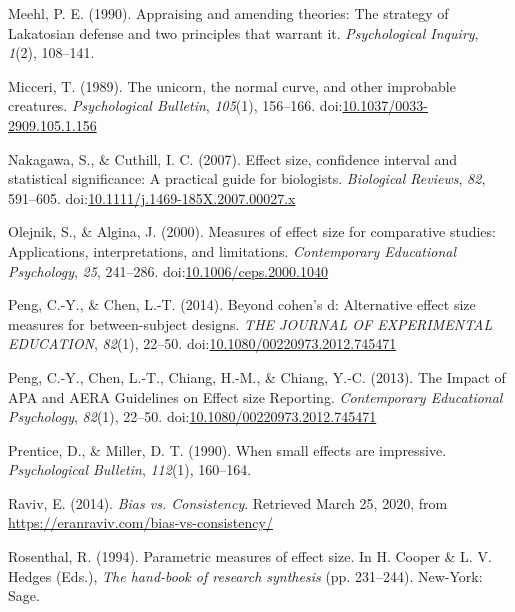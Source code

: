 \documentclass[
  man,floatsintext]{apa6}
\begin{document}
\leavevmode\hypertarget{ref-Meehl_1990}{}%
Meehl, P. E. (1990). Appraising and amending theories: The strategy of Lakatosian defense and two principles that warrant it. \emph{Psychological Inquiry}, \emph{1}(2), 108--141.

\leavevmode\hypertarget{ref-Micceri_1989}{}%
Micceri, T. (1989). The unicorn, the normal curve, and other improbable creatures. \emph{Psychological Bulletin}, \emph{105}(1), 156--166. doi:\href{https://doi.org/10.1037/0033-2909.105.1.156}{10.1037/0033-2909.105.1.156}

\leavevmode\hypertarget{ref-Nakagawa_and_Cuthill_2007}{}%
Nakagawa, S., \& Cuthill, I. C. (2007). Effect size, confidence interval and statistical significance: A practical guide for biologists. \emph{Biological Reviews}, \emph{82}, 591--605. doi:\href{https://doi.org/10.1111/j.1469-185X.2007.00027.x}{10.1111/j.1469-185X.2007.00027.x}

\leavevmode\hypertarget{ref-Olejnik_Algina_2000}{}%
Olejnik, S., \& Algina, J. (2000). Measures of effect size for comparative studies: Applications, interpretations, and limitations. \emph{Contemporary Educational Psychology}, \emph{25}, 241--286. doi:\href{https://doi.org/10.1006/ceps.2000.1040}{10.1006/ceps.2000.1040}

\leavevmode\hypertarget{ref-Peng_and_Chen_2014}{}%
Peng, C.-Y., \& Chen, L.-T. (2014). Beyond cohen's d: Alternative effect size measures for between-subject designs. \emph{THE JOURNAL OF EXPERIMENTAL EDUCATION}, \emph{82}(1), 22--50. doi:\href{https://doi.org/10.1080/00220973.2012.745471}{10.1080/00220973.2012.745471}

\leavevmode\hypertarget{ref-Peng_et_al_2013}{}%
Peng, C.-Y., Chen, L.-T., Chiang, H.-M., \& Chiang, Y.-C. (2013). The Impact of APA and AERA Guidelines on Effect size Reporting. \emph{Contemporary Educational Psychology}, \emph{82}(1), 22--50. doi:\href{https://doi.org/10.1080/00220973.2012.745471}{10.1080/00220973.2012.745471}

\leavevmode\hypertarget{ref-Prentice_Miller_1992}{}%
Prentice, D., \& Miller, D. T. (1990). When small effects are impressive. \emph{Psychological Bulletin}, \emph{112}(1), 160--164.

\leavevmode\hypertarget{ref-Raviv}{}%
Raviv, E. (2014). \emph{Bias vs. Consistency}. Retrieved March 25, 2020, from \url{https://eranraviv.com/bias-vs-consistency/}

\leavevmode\hypertarget{ref-Rosenthal_1994}{}%
Rosenthal, R. (1994). Parametric measures of effect size. In H. Cooper \& L. V. Hedges (Eds.), \emph{The hand-book of research synthesis} (pp. 231--244). New-York: Sage.
\end{document}
